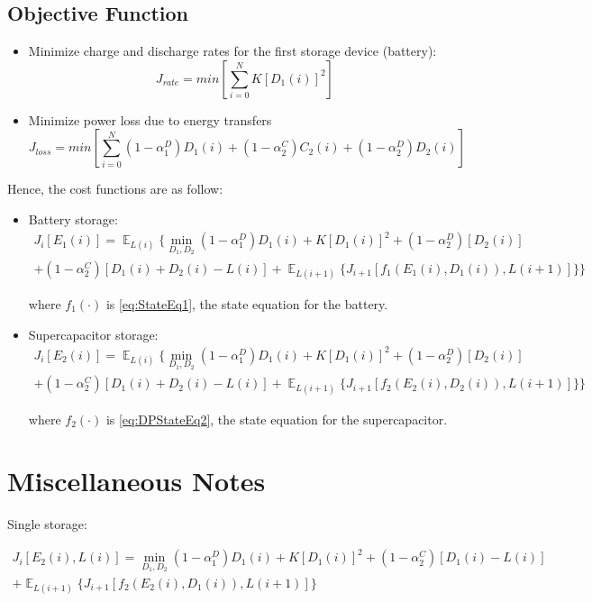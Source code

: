 \documentclass{article}
\begin{document}
	\subsection{Objective Function}
	\begin{itemize}
		\item Minimize charge and discharge rates
		 for the first storage device (battery):
		 \begin{equation}J_{rate}=min\left[\sum_{i=0}^{N}K\left[D_{1}(i)\right]^{2}\right]\end{equation}
 		\item Minimize power loss due to energy transfers
		 \begin{equation}J_{loss}=min\left[\sum_{i=0}^{N}
		 (1-\alpha_{1}^{D})D_{1}(i)+
		 (1-\alpha_{2}^{C})C_{2}(i)+
 		 (1-\alpha_{2}^{D})D_{2}(i)
		  \right]\end{equation}
	\end{itemize}
	
	Hence, the cost functions are as follow:
	  
	\begin{itemize}
		  \item Battery storage:\\
		  \begin{multline}
		  J_{i}[E_{1}(i)] = \mathop{\mathbb{E}}_{L(i)}
		  \{\min_{D_{1},D_{2}}
		  (1-\alpha_{1}^{D})D_{1}(i) 
		  	+ K[D_{1}(i)]^{2}
		  	+(1-\alpha_{2}^{D})[D_{2}(i)]\\	  +(1-\alpha_{2}^{C})[D_{1}(i)+D_{2}(i)-L(i)]
		  	+\mathop{\mathbb{E}}_{L(i+1)}\{J_{i+1}[f_{1}(E_{1}(i),D_{1}(i)),L(i+1)]\}\}
		  \end{multline}
		  
		  where $f_{1}(\cdot)$ is \eqref{eq:StateEq1}, the state equation for the battery.
		  
		  \item Supercapacitor storage:\\
		  \begin{multline}
		  J_{i}[E_{2}(i)] = \mathop{\mathbb{E}}_{L(i)} \{\min_{D_{1},D_{2}}
		  (1-\alpha_{1}^{D})D_{1}(i) 
		  	+ K[D_{1}(i)]^{2}
		  	+(1-\alpha_{2}^{D})[D_{2}(i)]\\	  +(1-\alpha_{2}^{C})[D_{1}(i)+D_{2}(i)-L(i)]
		  	+\mathop{\mathbb{E}}_{L(i+1)} \{J_{i+1}[f_{2}(E_{2}(i),D_{2}(i)),L(i+1)]\}\}
		  \end{multline}
		  
		  where $f_{2}(\cdot)$ is \eqref{eq:DPStateEq2}, the state equation for the supercapacitor.
	\end{itemize}


	\section{Miscellaneous Notes}
	Single storage:
	
	\begin{multline}
	J_{i}[E_{2}(i),L(i)] = \min_{D_{1},D_{2}}
	(1-\alpha_{1}^{D})D_{1}(i) 
	+ K[D_{1}(i)]^{2}
	+(1-\alpha_{2}^{C})[D_{1}(i)-L(i)]\\
	+\mathop{\mathbb{E}}_{L(i+1)} \{J_{i+1}[f_{2}(E_{2}(i),D_{1}(i)),L(i+1)]\}
	\end{multline}
	
	
	
\end{document}
